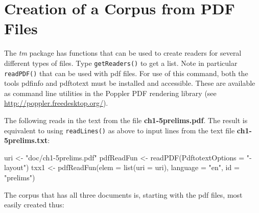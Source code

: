 \documentclass{tufte-book}\usepackage[]{graphicx}\usepackage[]{color}
\newcommand{\txtt}[1]{\texttt{#1}}
\begin{document}
\section{Creation of a Corpus from PDF Files}

The {\em tm} package has functions that can be used to create readers
for several different types of files.  Type \txtt{getReaders()} to get
a list.  Note in particular \txtt{readPDF()} that can be used with pdf
files.  For use of this command, both the tools pdfinfo and pdftotext
must be installed and accessible.  These are available as command line
utilities in the Poppler PDF rendering library (see
\url{http://poppler.freedesktop.org/}).

The following reads in the text from the file {\bf ch1-5prelims.pdf}.
The result is equivalent to using \txtt{readLines()} as above to
input lines from the text file {\bf ch1-5prelims.txt}:
\begin{Schunk}
\begin{Sinput}
uri <- "doc/ch1-5prelims.pdf"
pdfReadFun <- readPDF(PdftotextOptions = "-layout")
txx1 <- pdfReadFun(elem = list(uri = uri),
                   language = "en", id = "prelims")
\end{Sinput}
\end{Schunk}

The corpus that has all three documents is, starting with the
pdf files, most easily created thus:
\begin{fullwidth}
\begin{Schunk}
\end{Schunk}
\end{fullwidth}
\end{document}
